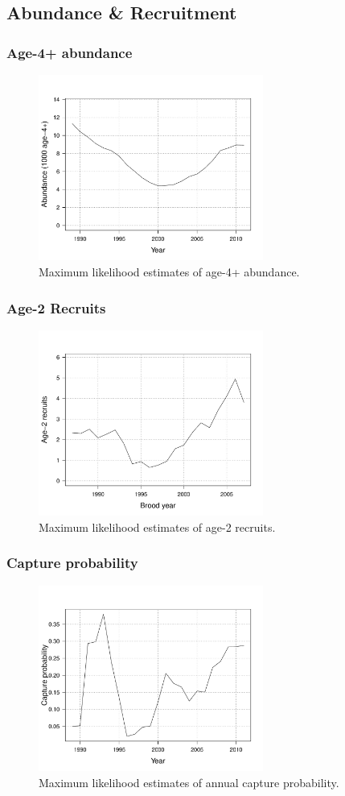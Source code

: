 \documentclass{beamer}
\begin{document}
\subsection[Abundance]{Abundance & Recruitment} %
\label{sub:abundance_recruitment}
\begin{frame}[t]\frametitle{Age-4+ abundance}
	\begin{figure}[htbp]
		\centering
			\includegraphics[height=2.4in]{../../FIGS/ASMR/fig:nt4.pdf}
		\caption{Maximum likelihood estimates of age-4+ abundance.}
		\label{fig:FIGS_ASMR_fig:nt4}
	\end{figure}
\end{frame}
%
\begin{frame}[t]\frametitle{Age-2 Recruits}
	\begin{figure}[htbp]
		\centering
			\includegraphics[height=2.4in]{../../FIGS/ASMR/fig:rt.pdf}
		\caption{Maximum likelihood estimates of age-2 recruits.}
		\label{fig:FIGS_ASMR_fig:rt}
	\end{figure}
\end{frame}
%
\begin{frame}[t]\frametitle{Capture probability}
	\begin{figure}[htbp]
		\centering
			\includegraphics[height=2.4in]{../../FIGS/ASMR/fig:pt.pdf}
		\caption{Maximum likelihood estimates of annual capture probability.}
		\label{fig:FIGS_ASMR_fig:pt}
	\end{figure}
\end{frame}
%
\end{document}
